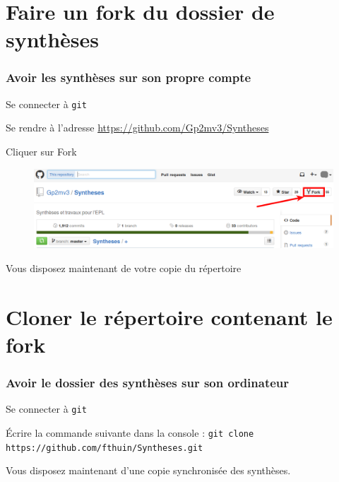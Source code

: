 \documentclass{beamer}
\newenvironment{wideitemize}{\itemize\addtolength{\itemsep}{10pt}}{\enditemize}
\begin{document}
\section{Faire un fork du dossier de synthèses}

\begin{frame}
	\frametitle{Avoir les synthèses sur son propre compte}
		\begin{wideitemize}
			\item Se connecter à \lstinline|git|
			\pause
			\item Se rendre à l'adresse
                \url{https://github.com/Gp2mv3/Syntheses}
			\pause
			\item Cliquer sur Fork
                \begin{figure}[H]
                    \centering
                    \includegraphics[width=\linewidth]{fork.png}
                \end{figure}
			\pause
			\item Vous disposez maintenant de votre copie du répertoire
		\end{wideitemize}
\end{frame}

\section{Cloner le répertoire contenant le fork}

\begin{frame}[fragile]
    \frametitle{Avoir le dossier des synthèses sur son ordinateur}
    \begin{wideitemize}
        \item Se connecter à \lstinline|git|
        \pause
        \item Écrire la commande suivante dans la console :
            \lstinline[mathescape]|git clone https://github.com/fthuin/Syntheses.git|
        \pause
        \item Vous disposez maintenant d'une copie synchronisée des
            synthèses.
    \end{wideitemize}
\end{frame}
\end{document}
